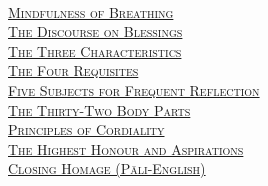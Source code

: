 {  {\libertinusFont\selectfont\textbf{\textsc{\ifafiveversion\fontsize{18}{12}\fi\ifninebythirteenversion\fontsize{13}{8.5}\fi\ifbfiveversion\fontsize{22}{18}\fi\selectfont{}}}}\\
  \textsc{\ifafiveversion\fontsize{14.4}{28}\fi\ifninebythirteenversion\fontsize{8.7}{17}\fi\ifbfiveversion\fontsize{16}{33.5}\fi\selectfont
    \hyperref[mindfulness-of-breathing]{Mindfulness of Breathing} \ifdigitalversion\else\pageref{mindfulness-of-breathing}\fi\\
    \hyperref[discourse-on-blessings]{The Discourse on Blessings} \ifdigitalversion\else\pageref{discourse-on-blessings}\fi\\
    \hyperref[three-characteristics]{The Three Characteristics} \ifdigitalversion\else\pageref{three-characteristics}\fi\\
    \hyperref[four-requisites]{The Four Requisites} \ifdigitalversion\else\pageref{four-requisites}\fi\\
    \hyperref[five-reflections]{Five Subjects for Frequent Reflection} \ifdigitalversion\else\pageref{five-reflections}\fi\\
    \hyperref[32-parts]{The Thirty-Two Body Parts} \ifdigitalversion\else\pageref{32-parts}\fi\\
    \hyperref[principles-of-cordiality]{Principles of Cordiality} \ifdigitalversion\else\pageref{principles-of-cordiality}\fi\\
    \hyperref[highest-honour-aspirations]{The Highest Honour and Aspirations} \ifdigitalversion\else\pageref{highest-honour-aspirations}\fi\\
    \hyperref[closing-homage]{Closing Homage (Pāli-English)} \ifdigitalversion\else\pageref{closing-homage}\fi\\
  }

  \ifafiveversion\vspace{1.0cm}\fi
  \ifninebythirteenversion\vspace{0.8cm}\fi
  \ifbfiveversion\vspace{1.0cm}\fi

}
